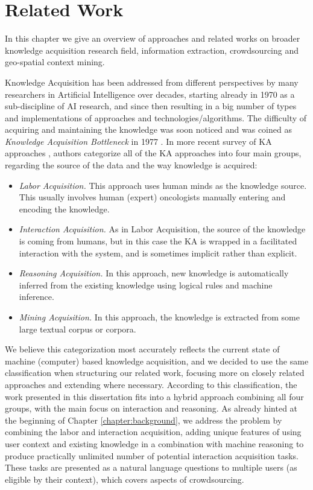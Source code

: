 \chapter{Related Work}
\label{chapter:related}
In this chapter we give an overview of approaches and related works on
broader knowledge acquisition research field, information extraction, 
crowdsourcing and geo-spatial context mining. 

Knowledge Acquisition has been addressed from different perspectives by many 
researchers in Artificial Intelligence over decades, starting already in 1970 
as a sub-discipline of AI research, and since then resulting in a big number of 
types and implementations of approaches and technologies/algorithms. The 
difficulty of acquiring and maintaining the knowledge was soon noticed and was 
coined as \emph{Knowledge Acquisition Bottleneck} in 
1977 \parencite{Feigenbaum1977}. In more recent survey of KA approaches 
\parencite{Zang2013}, authors categorize all of the KA approaches into four main
groups, regarding the source of the data and the way knowledge is acquired:
\begin{itemize}
	\item \emph{Labor Acquisition.} This approach uses human minds as the 
    knowledge source. This usually involves human (expert) oncologists manually 
    entering and encoding the knowledge.
	\item \emph{Interaction Acquisition.} As in Labor Acquisition, the source 
    of the knowledge is coming from humans, but in this case the KA is wrapped 
    in a facilitated interaction with the system, and is sometimes implicit 
    rather than explicit.
	\item \emph{Reasoning Acquisition.} In this approach, new knowledge is 
    automatically inferred from the existing knowledge using logical rules and 
    machine inference.
	\item \emph{Mining Acquisition.} In this approach, the knowledge is 
    extracted from some large textual corpus or corpora.
\end{itemize}

We believe this categorization most accurately reflects the current state of 
machine (computer) based knowledge acquisition, and we decided to use the same 
classification when structuring our related work, focusing more on closely 
related approaches and extending where necessary. According to this 
classification, the work presented in this dissertation fits into a hybrid 
approach combining all four groups, with the main focus on interaction and 
reasoning. As already hinted at the beginning of Chapter \ref{chapter:background},
we address the problem by combining the labor and interaction acquisition, 
adding unique features of using user context and existing knowledge in a 
combination with machine reasoning to produce practically unlimited number of 
potential interaction acquisition tasks. These tasks are presented as a 
natural language questions to multiple users (as eligible by their context),
which covers aspects of crowdsourcing. 

